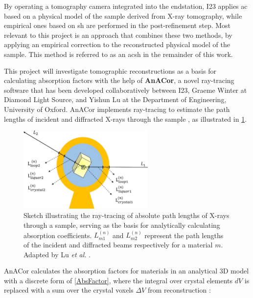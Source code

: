 By operating a tomography camera integrated into the endstation, I23 applies \ac{ac} based on a physical model of the sample derived from X-ray tomography, while empirical ones based on \ac{sh} are performed in the post-refinement step. Most relevant to this project is an approach that combines these two methods, by applying an empirical correction to the reconstructed physical model of the sample. This method is referred to as an \ac{acsh} in the remainder of this work. %

This project will investigate tomographic reconstructions as a basis for calculating absorption factors with the help of \textbf{AnACor}, a novel ray-tracing software that has been developed collaboratively between I23, Graeme Winter at Diamond Light Source, and Yishun Lu at the Department of Engineering, University of Oxford. AnACor implements ray-tracing to estimate the path lengths of incident and diffracted X-rays through the sample \cite{Lu2024}, as illustrated in \cref{fig:analytical correction model}.

\begin{figure}
    \centering
    \includegraphics[width = 0.6\textwidth]{images/absorption correction diagram.jpg}
    \caption{Sketch illustrating the ray-tracing of absolute path lengths of X-rays through a sample, serving as the basis for analytically calculating absorption coefficients. $L_{m1}^{(n)}$ and $L_{m2}^{(n)}$ represent the path lengths of the incident and diffracted beams respectively for a material $m$. Adapted by Lu \textit{et al.} \cite{Lu2024}.
    }
    \label{fig:analytical correction model}
\end{figure}

AnACor calculates the absorption factors for materials in an analytical 3D model with a discrete form of \cref{AbsFactor}, where the integral over crystal elements $dV$ is replaced with a sum over the crystal voxels $\Delta V$ from  reconstruction \cite{Lu2024}: %

